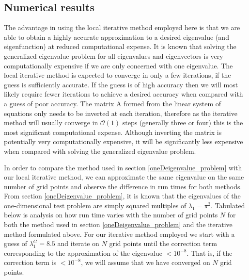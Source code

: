 \documentclass[a4paper, 12pt, twoside, openright]{article}
\numberwithin{equation}{section}
\begin{document}
\subsection{Numerical results}
The advantage in using the local iterative method employed here is that we are able to obtain a highly accurate approximation to a desired eigenvalue (and eigenfunction) at reduced computational expense. It is known that solving the generalized eigenvalue problem for all eigenvalues and eigenvectors is very computationally expensive if we are only concerned with one eigenvalue. The local iterative method is expected to converge in only a few iterations, if the guess is sufficiently accurate. If the guess is of high accuracy then we will most likely require fewer iterations to achieve a desired accuracy when compared with a guess of poor accuracy. The matrix $\mathrm{A}$ formed from the linear system of equations only needs to be inverted at each iteration, therefore as the iterative method will usually converge in $\mathcal{O}(1)$ steps (generally three or four) this is the most significant computational expense. Although inverting the matrix is potentially very computationally expensive, it will be significantly less expensive when compared with solving the generalized eigenvalue problem. %

In order to compare the method used in section \ref{oneDeigenvalue_problem} with our local iterative method, we can approximate the same eigenvalue on the same number of grid points and observe the difference in run times for both methods. From section \ref{oneDeigenvalue_problem}, it is known that the eigenvalues of the one-dimensional test problem are simply squared multiples of $\lambda_1 = \pi^2$. Tabulated below is analysis on how run time varies with the number of grid points $N$ for both the method used in section \ref{oneDeigenvalue_problem} and the iterative method formulated above. For our iterative method employed we start with a guess of $\lambda^{G}_1 = 8.5 $ and iterate on $N$ grid points until the correction term corresponding to the approximation of the eigenvalue $< 10^{-8}$. That is, if the correction term is $<10^{-8}$, we will assume that we have converged on $N$ grid points.    
\end{document}
